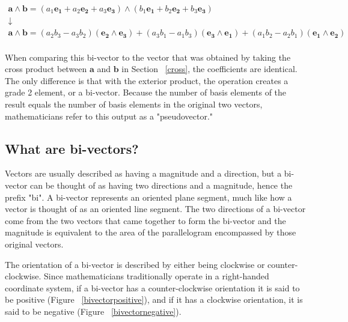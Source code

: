 \documentclass{amsart}
\begin{document}
		\begin{gather}
			\label{bi}
			\mathbf{a} \wedge \mathbf{b} = (a_1 \mathbf{e_1} + a_2 \mathbf{e_2} + a_3 \mathbf{e_3}) \wedge (b_1 \mathbf{e_1} + b_2 \mathbf{e_2} + b_3 \mathbf{e_3}) \\
			\downarrow \nonumber \\
			\mathbf{a} \wedge \mathbf{b} = (a_2 b_3 - a_3 b_2)(\mathbf{e_2} \wedge \mathbf{e_3}) + (a_3 b_1 - a_1 b_3)(\mathbf{e_3} \wedge \mathbf{e_1}) + (a_1 b_2 - a_2 b_1)(\mathbf{e_1} \wedge \mathbf{e_2})
			\nonumber
		\end{gather} \\
		
		When comparing this bi-vector to the vector that was obtained by taking the cross product between $\mathbf{a}$ and $\mathbf{b}$ in Section ~\ref{cross}, the coefficients are identical. The only difference is that with the exterior product, the operation creates a grade 2 element, or a bi-vector. Because the number of basis elements of the result equals the number of basis elements in the original two vectors, mathematicians refer to this output as a "pseudovector."

		\subsection{What are bi-vectors?}\label{sub:3.1} 
			Vectors are usually described as having a magnitude and a direction, but a bi-vector can be thought of as having two directions and a magnitude, hence the prefix  "bi". A bi-vector represents an oriented plane segment, much like how a vector is thought of as an oriented line segment. The two directions of a bi-vector come from the two vectors that came together to form the bi-vector and the magnitude is equivalent to the area of the parallelogram encompassed by those original vectors.
			
			The orientation of a bi-vector is described by either being clockwise or counter-clockwise. Since mathematicians traditionally operate in a right-handed coordinate system, if a bi-vector has a counter-clockwise orientation it is said to be positive (Figure ~\ref{bivectorpositive}), and if it has a clockwise orientation, it is said to be negative (Figure ~\ref{bivectornegative}).
			
\end{document}
